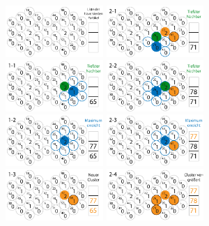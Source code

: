 \documentclass[10pt]{beamer}
\begin{document}
\begin{frame}
	\includegraphics*[width=3.7cm]{media/cluster/cfd000.png} \includegraphics*[width=3.7cm]{media/cluster/cfd004.png} \\
	\includegraphics*[width=3.7cm]{media/cluster/cfd001.png} \includegraphics*[width=3.7cm]{media/cluster/cfd005.png} \\
	\includegraphics*[width=3.7cm]{media/cluster/cfd002.png} \includegraphics*[width=3.7cm]{media/cluster/cfd006.png} \\
	\includegraphics*[width=3.7cm]{media/cluster/cfd003.png} \includegraphics*[width=3.7cm]{media/cluster/cfd007.png}
\end{frame}
\end{document}
